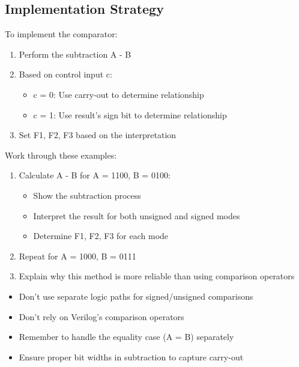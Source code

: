 \documentclass[12pt]{labmanual}
\begin{document}
\subsection{Implementation Strategy}

To implement the comparator:
\begin{enumerate}
    \item Perform the subtraction A - B
    \item Based on control input c:
    \begin{itemize}
        \item c = 0: Use carry-out to determine relationship
        \item c = 1: Use result's sign bit to determine relationship
    \end{itemize}
    \item Set F1, F2, F3 based on the interpretation
\end{enumerate}

\begin{question}
Work through these examples:
\begin{enumerate}
    \item Calculate A - B for A = 1100, B = 0100:
    \begin{itemize}
        \item Show the subtraction process
        \item Interpret the result for both unsigned and signed modes
        \item Determine F1, F2, F3 for each mode
    \end{itemize}
    \item Repeat for A = 1000, B = 0111
    \item Explain why this method is more reliable than using comparison operators
\end{enumerate}
\end{question}

\begin{extra}[frametitle={Common Pitfalls to Avoid}]
\begin{itemize}
    \item Don't use separate logic paths for signed/unsigned comparisons
    \item Don't rely on Verilog's comparison operators
    \item Remember to handle the equality case (A = B) separately
    \item Ensure proper bit widths in subtraction to capture carry-out
\end{itemize}
\end{extra}
\end{document}
